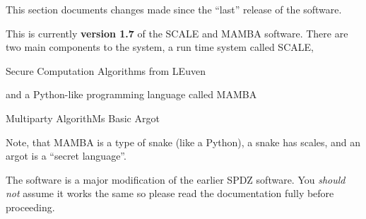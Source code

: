 
This section documents changes made since the ``last'' release of
the software.

\vspace{5mm}

\noindent
This is currently {\bf version 1.7} of the SCALE and MAMBA software.
There are two main components to the system, a run time system called
SCALE,
\begin{center}
  Secure Computation Algorithms from LEuven
\end{center}
and a Python-like programming language called MAMBA
\begin{center}
  Multiparty AlgorithMs Basic Argot
\end{center}
Note, that MAMBA is a type of snake (like a Python), a snake
has scales, and an argot is a ``secret language''.

\vspace{5mm}

\noindent
The software is a major modification of the earlier SPDZ software.
You {\em should not} assume it works the same so please read
the documentation fully before proceeding.


